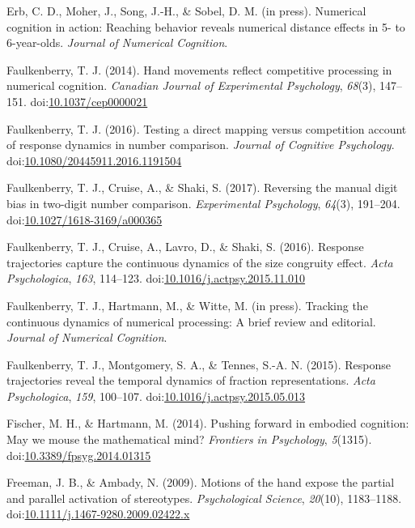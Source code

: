 \documentclass[english,man]{apa6}
\theoremstyle{definition}
\theoremstyle{definition}
\theoremstyle{definition}
\theoremstyle{remark}
\begin{document}
\hypertarget{ref-erb2018}{}
Erb, C. D., Moher, J., Song, J.-H., \& Sobel, D. M. (in press).
Numerical cognition in action: Reaching behavior reveals numerical
distance effects in 5- to 6-year-olds. \emph{Journal of Numerical
Cognition}.

\hypertarget{ref-faulkenberry2014}{}
Faulkenberry, T. J. (2014). Hand movements reflect competitive
processing in numerical cognition. \emph{Canadian Journal of
Experimental Psychology}, \emph{68}(3), 147--151.
doi:\href{https://doi.org/10.1037/cep0000021}{10.1037/cep0000021}

\hypertarget{ref-faulkenberry2016}{}
Faulkenberry, T. J. (2016). Testing a direct mapping versus competition
account of response dynamics in number comparison. \emph{Journal of
Cognitive Psychology}.
doi:\href{https://doi.org/10.1080/20445911.2016.1191504}{10.1080/20445911.2016.1191504}

\hypertarget{ref-faulkenberry2017}{}
Faulkenberry, T. J., Cruise, A., \& Shaki, S. (2017). Reversing the
manual digit bias in two-digit number comparison. \emph{Experimental
Psychology}, \emph{64}(3), 191--204.
doi:\href{https://doi.org/10.1027/1618-3169/a000365}{10.1027/1618-3169/a000365}

\hypertarget{ref-faulkenberryShaki2016}{}
Faulkenberry, T. J., Cruise, A., Lavro, D., \& Shaki, S. (2016).
Response trajectories capture the continuous dynamics of the size
congruity effect. \emph{Acta Psychologica}, \emph{163}, 114--123.
doi:\href{https://doi.org/10.1016/j.actpsy.2015.11.010}{10.1016/j.actpsy.2015.11.010}

\hypertarget{ref-faulkenberry2018}{}
Faulkenberry, T. J., Hartmann, M., \& Witte, M. (in press). Tracking the
continuous dynamics of numerical processing: A brief review and
editorial. \emph{Journal of Numerical Cognition}.

\hypertarget{ref-faulkenberry2015}{}
Faulkenberry, T. J., Montgomery, S. A., \& Tennes, S.-A. N. (2015).
Response trajectories reveal the temporal dynamics of fraction
representations. \emph{Acta Psychologica}, \emph{159}, 100--107.
doi:\href{https://doi.org/10.1016/j.actpsy.2015.05.013}{10.1016/j.actpsy.2015.05.013}

\hypertarget{ref-fischerHartmann2014}{}
Fischer, M. H., \& Hartmann, M. (2014). Pushing forward in embodied
cognition: May we mouse the mathematical mind? \emph{Frontiers in
Psychology}, \emph{5}(1315).
doi:\href{https://doi.org/10.3389/fpsyg.2014.01315}{10.3389/fpsyg.2014.01315}

\hypertarget{ref-freeman2009motions}{}
Freeman, J. B., \& Ambady, N. (2009). Motions of the hand expose the
partial and parallel activation of stereotypes. \emph{Psychological
Science}, \emph{20}(10), 1183--1188.
doi:\href{https://doi.org/10.1111/j.1467-9280.2009.02422.x}{10.1111/j.1467-9280.2009.02422.x}
\end{document}
